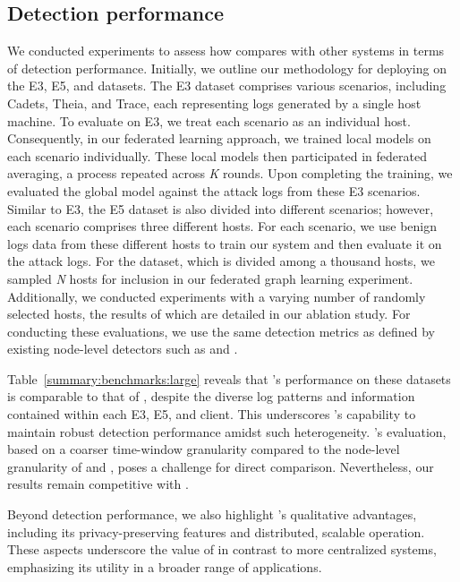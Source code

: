  \subsection{Detection performance}

 We conducted experiments to assess how \Sys compares with other systems in terms of detection performance. Initially, we outline our methodology for deploying \Sys on the \darpa E3, E5, and \optc datasets. The E3 dataset comprises various scenarios, including Cadets, Theia, and Trace, each representing logs generated by a single host machine. To evaluate \Sys on E3, we treat each scenario as an individual host. Consequently, in our federated learning approach, we trained local \gnnshort models on each scenario individually. These local models then participated in federated averaging, a process repeated across \textit{K} rounds. Upon completing the training, we evaluated the global \gnnshort model against the attack logs from these E3 scenarios. Similar to E3, the E5 dataset is also divided into different scenarios; however, each scenario comprises three different hosts. For each scenario, we use benign logs data from these different hosts to train our system and then evaluate it on the attack logs. For the \optc dataset, which is divided among a thousand hosts, we sampled \textit{N} hosts for inclusion in our federated graph learning experiment. Additionally, we conducted experiments with a varying number of randomly selected hosts, the results of which are detailed in our ablation study. For conducting these evaluations, we use the same detection metrics as defined by existing node-level detectors such as \threatrace and \flash.

 Table~\ref{summary:benchmarks:large} reveals that \Sys's performance on these datasets is comparable to that of \flash, despite the diverse log patterns and information contained within each E3, E5, and \optc client. This underscores \Sys's capability to maintain robust detection performance amidst such heterogeneity. \kairos's evaluation, based on a coarser time-window granularity compared to the node-level granularity of \flash and \Sys, poses a challenge for direct comparison. Nevertheless, our results remain competitive with \kairos.
 
 Beyond detection performance, we also highlight \Sys's qualitative advantages, including its privacy-preserving features and distributed, scalable operation. These aspects underscore the value of \Sys in contrast to more centralized systems, emphasizing its utility in a broader range of applications.

